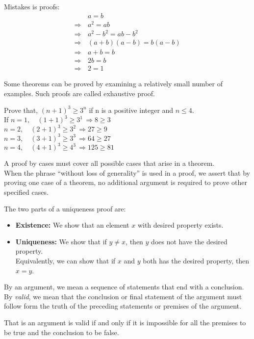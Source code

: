 \documentclass[../main-sheet.tex]{subfiles}
\begin{document}
Mistakes is proofs:
\begin{align*}
                & \,a = b              \\
    \Rightarrow & \,a^2 =ab            \\
    \Rightarrow & \,a^2-b^2=ab-b^2     \\
    \Rightarrow & \,(a+b)(a-b)= b(a-b) \\
    \Rightarrow & \,a+b=b              \\
    \Rightarrow & \,2b=b               \\
    \Rightarrow & \,2=1
\end{align*}
\begin{defn}
    Some theorems can be proved by examining a relatively small number of examples. Such proofs are called exhaustive proof.
\end{defn}
\begin{ex}
    Prove that, \((n+1)^3\geq3^n\) if n is a positive integer and \(n\leq4\).\\
    If \(n=1,\quad(1+1)^3\geq3^1\,\Rightarrow8\geq3\)\\
    \(n=2,\quad(2+1)^3\geq3^2\,\Rightarrow27\geq9\)\\
    \(n=3,\quad(3+1)^3\geq3^3\,\Rightarrow64\geq27\)\\
    \(n=4,\quad(4+1)^3\geq4^3\,\Rightarrow125\geq81\)\\
\end{ex}
A proof by cases must cover all possible cases that arise in a theorem.\\
When the phrase ``without loss of generality'' is used in a proof, we assert that by proving one case of a theorem, no additional argument is required to prove other specified cases.
\begin{defn}
    The two parts of a uniqueness proof are:
    \begin{itemize}
        \item \textbf{Existence:} We show that an element $ x $ with desired property exists.
        \item \textbf{Uniqueness:} We show that if \(y\neq x\), then $ y $ does not have the desired property.\\
              Equivalently, we can show that if $ x $ and $ y $ both has the desired property, then \(x=y\).
    \end{itemize}
\end{defn}
\begin{defn}[Argument]
    By an argument, we mean a sequence of statements that end with a conclusion.\\
    By \emph{valid}, we mean that the conclusion or final statement of the argument must follow form the truth of the preceding statements or premises of the argument.

    That is an argument is valid if and only if it is impossible for all the premises to be true and the conclusion to be false.
\end{defn}
\end{document}
